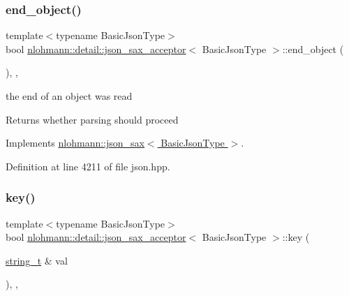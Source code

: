 \subsubsection{\texorpdfstring{end\+\_\+object()}{end\_object()}}
{\footnotesize\ttfamily template$<$typename Basic\+Json\+Type$>$ \\
bool \hyperlink{classnlohmann_1_1detail_1_1json__sax__acceptor}{nlohmann\+::detail\+::json\+\_\+sax\+\_\+acceptor}$<$ Basic\+Json\+Type $>$\+::end\+\_\+object (\begin{DoxyParamCaption}{ }\end{DoxyParamCaption})\hspace{0.3cm}{\ttfamily [inline]}, {\ttfamily [override]}, {\ttfamily [virtual]}}



the end of an object was read 

\begin{DoxyReturn}{Returns}
whether parsing should proceed 
\end{DoxyReturn}


Implements \hyperlink{structnlohmann_1_1json__sax_ad0c722d53ff97be700ccf6a9468bd456}{nlohmann\+::json\+\_\+sax$<$ Basic\+Json\+Type $>$}.



Definition at line 4211 of file json.\+hpp.

\mbox{\label{classnlohmann_1_1detail_1_1json__sax__acceptor_aba0060ee0b3156682d93bbd4be96a0cc}} 
\subsubsection{\texorpdfstring{key()}{key()}}
{\footnotesize\ttfamily template$<$typename Basic\+Json\+Type$>$ \\
bool \hyperlink{classnlohmann_1_1detail_1_1json__sax__acceptor}{nlohmann\+::detail\+::json\+\_\+sax\+\_\+acceptor}$<$ Basic\+Json\+Type $>$\+::key (\begin{DoxyParamCaption}\item[{\hyperlink{structnlohmann_1_1json__sax_ae01977a9f3c5b3667b7a2929ed91061e}{string\+\_\+t} \&}]{val }\end{DoxyParamCaption})\hspace{0.3cm}{\ttfamily [inline]}, {\ttfamily [override]}, {\ttfamily [virtual]}}



